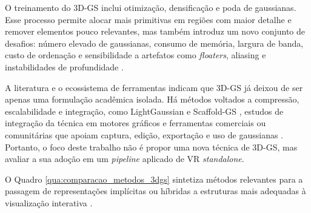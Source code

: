O treinamento do 3D-GS inclui otimização, densificação e poda de gaussianas. Esse processo permite alocar mais primitivas em regiões com maior detalhe e remover elementos pouco relevantes, mas também introduz um novo conjunto de desafios: número elevado de gaussianas, consumo de memória, largura de banda, custo de ordenação e sensibilidade a artefatos como \textit{floaters}, aliasing e instabilidades de profundidade \cite{kerbl2023,fei2025survey3dgs,fan2024lightgaussian}.

A literatura e o ecossistema de ferramentas indicam que 3D-GS já deixou de ser apenas uma formulação acadêmica isolada. Há métodos voltados a compressão, escalabilidade e integração, como LightGaussian e Scaffold-GS \cite{lu2024scaffoldgs,fan2024lightgaussian}, estudos de integração da técnica em motores gráficos \cite{jin2024} e ferramentas comerciais ou comunitárias que apoiam captura, edição, exportação e uso de gaussianas \cite{kiri3dgs}. Portanto, o foco deste trabalho não é propor uma nova técnica de 3D-GS, mas avaliar a sua adoção em um \textit{pipeline} aplicado de VR \textit{standalone}.

O Quadro \ref{qua:comparacao_metodos_3dgs} sintetiza métodos relevantes para a passagem de representações implícitas ou híbridas a estruturas mais adequadas à visualização interativa \cite{mildenhall2020,kerbl2023,chen2024survey3dgs}.

